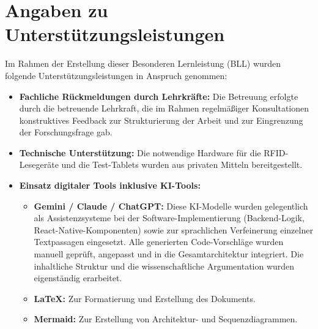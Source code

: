 \section*{Angaben zu Unterstützungsleistungen}

Im Rahmen der Erstellung dieser Besonderen Lernleistung (BLL) wurden folgende Unterstützungsleistungen in Anspruch genommen:

\begin{itemize}[leftmargin=1.5em]
    \item \textbf{Fachliche Rückmeldungen durch Lehrkräfte:} Die Betreuung erfolgte durch die betreuende Lehrkraft, die im Rahmen regelmäßiger Konsultationen konstruktives Feedback zur Strukturierung der Arbeit und zur Eingrenzung der Forschungsfrage gab.
    \item \textbf{Technische Unterstützung:} Die notwendige Hardware für die RFID-Lesegeräte und die Test-Tablets wurden aus privaten Mitteln bereitgestellt.
    \item \textbf{Einsatz digitaler Tools inklusive KI-Tools:} 
    \begin{itemize}
        \item \textbf{Gemini / Claude / ChatGPT:} Diese KI-Modelle wurden gelegentlich als Assistenzsysteme bei der Software-Implementierung (Backend-Logik, React-Native-Komponenten) sowie zur sprachlichen Verfeinerung einzelner Textpassagen eingesetzt. Alle generierten Code-Vorschläge wurden manuell geprüft, angepasst und in die Gesamtarchitektur integriert. Die inhaltliche Struktur und die wissenschaftliche Argumentation wurden eigenständig erarbeitet.
        \item \textbf{LaTeX:} Zur Formatierung und Erstellung des Dokuments.
        \item \textbf{Mermaid:} Zur Erstellung von Architektur- und Sequenzdiagrammen.
    \end{itemize}
\end{itemize}

